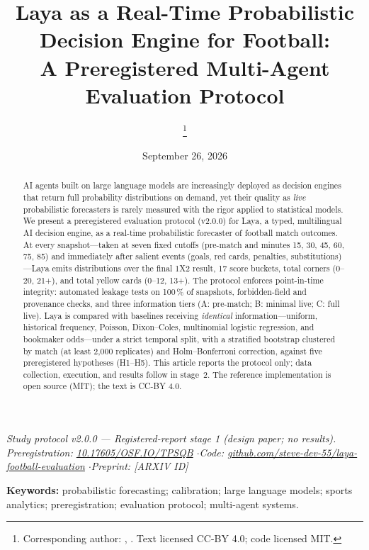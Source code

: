 \documentclass[11pt]{article}
\title{\textbf{Laya as a Real-Time Probabilistic Decision Engine for Football:\\
A Preregistered Multi-Agent Evaluation Protocol}}
\author{\AuthorName\thanks{Corresponding author: \AuthorName, \Affil.
Text licensed CC-BY 4.0; code licensed MIT.}\\[2pt]
{\small \Affil}}
\date{September 26, 2026}
\newcommand{\GitHubURL}{\href{https://github.com/steve-dev-55/laya-football-evaluation}{github.com/steve-dev-55/laya-football-evaluation}}
\newcommand{\OsfDOI}{\href{https://doi.org/10.17605/OSF.IO/TPSQB}{10.17605/OSF.IO/TPSQB}}
\newcommand{\ArxivID}{[ARXIV ID]}
\begin{document}
\maketitle
\thispagestyle{fancy}

\begin{center}
\small\itshape
Study protocol v2.0.0 --- Registered-report stage 1 (design paper; no results).
\\
Preregistration: \OsfDOI{} \quad$\cdot$\quad Code: \GitHubURL{} \quad$\cdot$\quad Preprint: \ArxivID{}
\end{center}
\vspace{2pt}

\begin{abstract}
\noindent
AI agents built on large language models are increasingly deployed as decision
engines that return full probability distributions on demand, yet their quality
as \emph{live} probabilistic forecasters is rarely measured with the rigor
applied to statistical models. We present a preregistered evaluation protocol
(v2.0.0) for Laya, a typed, multilingual AI decision engine, as a real-time
probabilistic forecaster of football match outcomes. At every snapshot---taken
at seven fixed cutoffs (pre-match and minutes 15, 30, 45, 60, 75, 85) and
immediately after salient events (goals, red cards, penalties,
substitutions)---Laya emits distributions over the final 1X2 result, 17 score
buckets, total corners (0--20, 21+), and total yellow cards (0--12, 13+). The
protocol enforces point-in-time integrity: automated leakage tests on 100\,\% of
snapshots, forbidden-field and provenance checks, and three information tiers
(A: pre-match; B: minimal live; C: full live). Laya is compared with baselines
receiving \emph{identical} information---uniform, historical frequency, Poisson,
Dixon--Coles, multinomial logistic regression, and bookmaker odds---under a
strict temporal split, with a stratified bootstrap clustered by match (at least
2{,}000 replicates) and Holm--Bonferroni correction, against five preregistered
hypotheses (H1--H5). This article reports the protocol only; data collection,
execution, and results follow in stage~2. The reference implementation is open
source (MIT); the text is CC-BY 4.0.
\end{abstract}

\vspace{4pt}
\noindent\textbf{Keywords:} probabilistic forecasting; calibration; large
language models; sports analytics; preregistration; evaluation protocol;
multi-agent systems.
\end{document}
